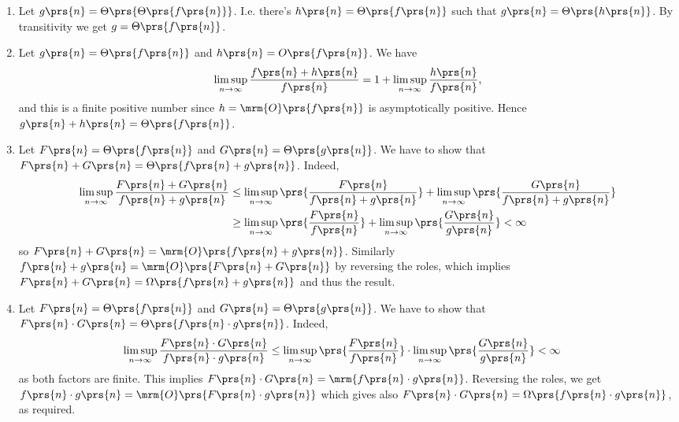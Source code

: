 \documentclass[oneside]{scrbook}
\theoremstyle{definition}
\begin{document}
\begin{problem}
\begin{enumerate}[label = \alph*.]
    \item Let $g\prs{n} = \Theta\prs{\Theta\prs{f\prs{n}}}$. I.e. there's $h\prs{n} = \Theta\prs{f\prs{n}}$ such that $g\prs{n} = \Theta\prs{h\prs{n}}$. By transitivity we get $g = \Theta\prs{f\prs{n}}$.
    
    \item Let $g\prs{n} = \Theta\prs{f\prs{n}}$ and $h\prs{n} = O\prs{f\prs{n}}$. We have
    \begin{align*}
        \limsup_{n\to\infty} \frac{f\prs{n} + h\prs{n}}{f\prs{n}} = 1 + \limsup_{n\to\infty} \frac{h\prs{n}}{f\prs{n}} \text{,}
    \end{align*}
    and this is a finite positive number since $h = \mrm{O}\prs{f\prs{n}}$ is asymptotically positive. Hence $g\prs{n} + h\prs{n} = \Theta\prs{f\prs{n}}$.
    
    \item Let $F\prs{n} = \Theta\prs{f\prs{n}}$ and $G\prs{n} = \Theta\prs{g\prs{n}}$. We have to show that $F\prs{n} + G\prs{n} = \Theta\prs{f\prs{n} + g\prs{n}}$. Indeed,
    \begin{align*}
        \limsup_{n\to\infty} \frac{F\prs{n} + G\prs{n}}{f\prs{n} + g\prs{n}} &\leq
        \limsup_{n\to\infty} \prs{\frac{F\prs{n}}{f\prs{n} + g\prs{n}}} +  \limsup_{n\to\infty} \prs{\frac{G\prs{n}}{f\prs{n} + g\prs{n}}}
        \\&\geq
        \limsup_{n\to\infty} \prs{\frac{F\prs{n}}{f\prs{n}}} +  \limsup_{n\to\infty} \prs{\frac{G\prs{n}}{g\prs{n}}} < \infty
    \end{align*}
    so $F\prs{n} + G\prs{n} = \mrm{O}\prs{f\prs{n} + g\prs{n}}$.
    Similarly $f\prs{n} + g\prs{n} = \mrm{O}\prs{F\prs{n} + G\prs{n}}$ by reversing the roles, which implies $F\prs{n} + G\prs{n} = \Omega\prs{f\prs{n} + g\prs{n}}$ and thus the result.
    
    \item Let $F\prs{n} = \Theta\prs{f\prs{n}}$ and $G\prs{n} = \Theta\prs{g\prs{n}}$. We have to show that $F\prs{n} \cdot G\prs{n} = \Theta\prs{f\prs{n} \cdot g\prs{n}}$. Indeed,
    \begin{align*}
        \limsup_{n\to\infty} \frac{F\prs{n} \cdot G\prs{n}}{f\prs{n} \cdot g\prs{n}} &\leq
        \limsup_{n\to\infty} \prs{\frac{F\prs{n}}{f\prs{n}}} \cdot \limsup_{n\to\infty} \prs{\frac{G\prs{n}}{g\prs{n}}} < \infty
    \end{align*}
    as both factors are finite. This implies $F\prs{n} \cdot G\prs{n} = \mrm{f\prs{n} \cdot g\prs{n}}$. Reversing the roles, we get $f\prs{n} \cdot g\prs{n} = \mrm{O}\prs{F\prs{n} \cdot g\prs{n}}$ which gives also $F\prs{n} \cdot G\prs{n} = \Omega\prs{f\prs{n} \cdot g\prs{n}}$, as required.
    

\end{enumerate}
\end{problem}
\end{document}
